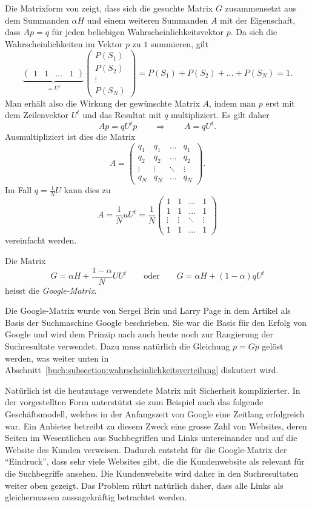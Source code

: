 Die Matrixform von
\label{buch:google:eqn:composed}
zeigt, dass sich die gesuchte Matrix $G$ zusammensetzt aus dem Summanden
$\alpha H$ und einem weiteren Summanden $A$ mit der Eigenschaft, dass
$Ap = q$ für jeden beliebigen Wahrscheinlichkeitsvektor $p$.
Da sich die Wahrscheinlichkeiten im Vektor $p$ zu $1$ summieren, gilt
\[
\underbrace{
\begin{pmatrix}
1&1&\dots&1
\end{pmatrix}
}_{\displaystyle = U^t}
\begin{pmatrix}
P(S_1)\\
P(S_2)\\
\vdots\\
P(S_N)
\end{pmatrix}
=
P(S_1)+P(S_2)+\dots+P(S_N)=1.
\]
Man erhält also die Wirkung der gewünschte Matrix $A$, indem man $p$
erst mit dem Zeilenvektor $U^t$ und das Resultat mit $q$ multipliziert.
Es gilt daher
\[
Ap = qU^tp
\qquad\Rightarrow\qquad
A=qU^t.
\]
Ausmultipliziert ist dies die Matrix
\[
A=\begin{pmatrix}
q_1&q_1&\dots&q_1\\
q_2&q_2&\dots&q_2\\
\vdots&\vdots&\ddots&\vdots\\
q_N&q_N&\dots&q_N
\end{pmatrix}.
\]
Im Fall $q=\frac1NU$ kann dies zu
\[
A
=
\frac1N uU^t
=
\frac1N
\begin{pmatrix}
1&1&\dots&1\\
1&1&\dots&1\\
\vdots&\vdots&\ddots&\vdots\\
1&1&\dots&1
\end{pmatrix}
\]
vereinfacht werden.

\begin{definition}
Die Matrix
\[
G
=
\alpha H
+
\frac{1-\alpha}{N}
UU^t
\qquad\text{oder}\qquad
G
=
\alpha H
+
(1-\alpha)qU^t
\]
heisst die
{\em Google-Matrix}.
%
\end{definition}

Die Google-Matrix wurde von Sergei Brin und Larry Page 
in dem Artikel \cite{BRIN1998107} als Basis der Suchmaschine
Google beschrieben.
Sie war die Basis für den Erfolg von Google und wird dem Prinzip nach
auch heute noch zur Rangierung der Suchresultate verwendet.
Dazu muss natürlich die Gleichung $p=Gp$ gelöst werden, was
weiter unten in Abschnitt~\ref{buch:subsection:wahrscheinlichkeitsverteilung}
diskutiert wird.

Natürlich ist die heutzutage verwendete Matrix mit Sicherheit komplizierter.
In der vorgestellten Form unterstützt sie zum Beispiel auch das folgende
Geschäftsmodell, welches in der Anfangszeit von Google eine Zeitlang 
erfolgreich war.
Ein Anbieter betreibt zu diesem Zweck eine grosse Zahl von Websites,
deren Seiten im Wesentlichen aus Suchbegriffen und Links untereinander
und auf die Website des Kunden verweisen.
Dadurch entsteht für die Google-Matrix der ``Eindruck'', dass sehr viele
Websites gibt, die die Kundenwebsite als relevant für die Suchbegriffe 
ansehen.
Die Kundenwebsite wird daher in den Suchresultaten weiter oben gezeigt.
Das Problem rührt natürlich daher, dass alle Links als gleichermassen
aussagekräftig betrachtet werden.

